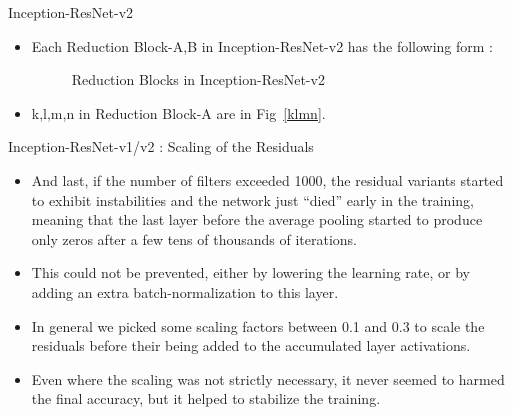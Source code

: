 \documentclass{beamer}
\begin{document}
\begin{frame}{Inception-ResNet-v2}
	\begin{itemize}
		\item Each Reduction Block-A,B in Inception-ResNet-v2 has the following form :
		\vspace{5pt}
		\begin{figure}[h]		
			\centering
			\quad
			\caption{Reduction Blocks in Inception-ResNet-v2}
			\label{Reduction Blocks v2}
		\end{figure}
		\vspace{5pt}
		\item k,l,m,n in Reduction Block-A are in Fig~\ref{klmn}.
	\end{itemize}
\end{frame}


\begin{frame}{Inception-ResNet-v1/v2 : Scaling of the Residuals }
	\begin{itemize}
		\item And last, if the number of filters exceeded 1000, the residual variants started to exhibit instabilities and the network just “died” early in the training, meaning that the last layer before the average pooling started to produce only zeros after a few tens of thousands of iterations.
		\item This could not be prevented, either by lowering the learning rate, or by
		adding an extra batch-normalization to this layer.
		\item In general we picked some scaling factors between 0.1 and 0.3 to scale the residuals before their being added to the accumulated layer activations.
		\item Even where the scaling was not strictly necessary, it never
		seemed to harmed the final accuracy, but it helped to stabilize
		the training.
	\end{itemize}
\end{frame}
\end{document}
